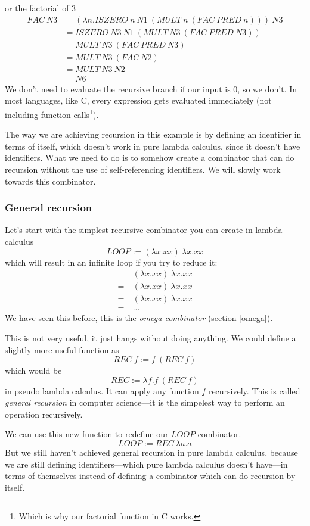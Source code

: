 \documentclass[11pt]{article}
\begin{document}
or the factorial of 3
\begin{align*}
	FAC\ N3&=(\lambda n.ISZERO\ n\ N1\ (MULT\ n\ (FAC\ PRED\ n)))\ N3\\
	&=ISZERO\ N3\ N1\ (MULT\ N3\ (FAC\ PRED\ N3))\\
	&=MULT\ N3\ (FAC\ PRED\ N3)\\
	&=MULT\ N3\ (FAC\ N2)\\
	&=MULT\ N3\ N2\\
	&=N6
\end{align*}
We don't need to evaluate the recursive branch if our input is 0, so we don't.
In most languages, like C, every expression gets evaluated immediately (not
including function calls\footnote{Which is why our factorial function in C
works.}).

The way we are achieving recursion in this example is by defining an identifier
in terms of itself, which doesn't work in pure lambda calculus, since it
doesn't have identifiers. What we need to do is to somehow create a combinator
that can do recursion without the use of self-referencing identifiers. We will
slowly work towards this combinator.

\subsubsection{General recursion}\label{general_recursion}

Let's start with the simplest recursive combinator you can create in lambda
calculus
\[LOOP:=(\lambda x.xx)\ \lambda x.xx\]
which will result in an infinite loop if you try to reduce it:
\begin{align*}
	&(\lambda x.xx)\ \lambda x.xx \\
	=\ &(\lambda x.xx)\ \lambda x.xx \\
	=\ &(\lambda x.xx)\ \lambda x.xx \\
	=\ & ...
\end{align*}
We have seen this before, this is the \emph{omega combinator} (section
\ref{omega}).

This is not very useful, it just hangs without doing anything. We could define
a slightly more useful function as
\[REC\ f:=f\ (REC\ f)\]
which would be
\[REC:=\lambda f.f\ (REC\ f)\]
in pseudo lambda calculus. It can apply any function \(f\) recursively. This is
called \emph{general recursion} in computer science---it is the simpelest way to
perform an operation recursively.

We can use this new function to redefine our \(LOOP\) combinator.
\[LOOP:=REC\ \lambda a.a\]
But we still haven't achieved general recursion in pure lambda calculus,
because we are still defining identifiers---which pure lambda calculus doesn't
have---in terms of themselves instead of defining a combinator which can do
recursion by itself.
\end{document}
